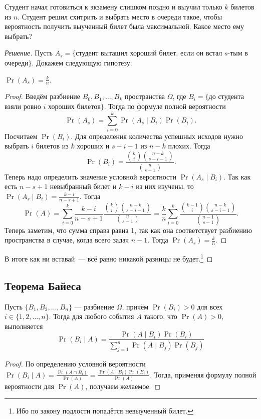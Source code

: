 \begin{problem}
    Студент начал готовиться к экзамену слишком поздно и выучил только \(k\) билетов из \(n\). Студент решил схитрить и выбрать место в очереди такое, чтобы вероятность получить выученный билет была максимальной. Какое место ему выбрать?
\end{problem}
\begin{proof}[Решение]
    Пусть \(A_{s} = \{\)студент вытащил хороший билет, если он встал \(s\)-тым в очереди\(\}\). Докажем следующую гипотезу:
    \begin{hypothesis}
        \(\Pr(A_{s}) = \frac{k}{n}\).
    \end{hypothesis}
    \begin{proof}
        Введём разбиение \(B_{0}, B_{1}, \ldots, B_{k}\) пространства \(\Omega\), где \(B_{i} = \{\)до студента взяли ровно \(i\) хороших билетов\(\}\). Тогда по формуле полной вероятности \[\Pr(A_{s}) = \sum\limits_{i = 0}^{k} \Pr(A_{s} \mid B_{i})\Pr(B_{i}).\]
        Посчитаем \(\Pr(B_{i})\). Для определения количества успешных исходов нужно выбрать \(i\) билетов из \(k\) хороших и \(s - i - 1\) из \(n - k\) плохих. Тогда \[\Pr(B_{i}) = \frac{\binom{k}{i}\binom{n - k}{s - i - 1}}{\binom{n}{s - 1}}.\]
        Теперь надо определить значение условной вероятности \(\Pr(A_{s} \mid B_{i})\). Так как есть \(n - s + 1\) невыбранный билет и \(k - i\) из них изучены, то \(\Pr(A_{s} \mid B_{i}) = \frac{k - i}{n - s + 1}\). Тогда
        \[\Pr(A) = \sum\limits_{i = 0}^{k}\frac{k - i}{n - s + 1}\frac{\binom{k}{i}\binom{n - k}{s - i - 1}}{\binom{n}{s - 1}} = \frac{k}{n}\sum\limits_{i = 0}^{k}\frac{\binom{k - 1}{i}\binom{n - k}{s - i - 1}}{\binom{n - 1}{s - 1}}.\]
        Теперь заметим, что сумма справа равна 1, так как она соответствует разбиению пространства в случае, когда всего задач \(n - 1\). Тогда \(\Pr(A_{s}) = \frac{k}{n}\).
    \end{proof}
    В итоге как ни вставай~--- всё равно никакой разницы не будет.\footnote{Ибо по закону подлости попадётся невыученный билет.}
\end{proof}

\subsection{Теорема Байеса}
\begin{theorem}[Байес]
    Пусть \(\{B_{1}, B_{2}, \ldots, B_{n}\}\) --- разбиение \(\Omega\), причём \(\Pr(B_i) > 0\) для всех \(i \in \{1, 2, \ldots, n\}\). Тогда для любого события \(A\) такого, что \(\Pr(A) > 0\), выполняется
    \[\Pr(B_i \mid A) = \frac{\Pr(A\mid B_i)\Pr(B_i)}{\sum\limits_{j = 1}^{n} \Pr(A\mid B_j)\Pr(B_j)}\]
\end{theorem}
\begin{proof}
    По определению условной вероятности \(\Pr(B_i\mid A) = \frac{\Pr(A\cap B_i)}{\Pr(A)} = \frac{\Pr(A\mid B_i)\Pr(B_i)}{\Pr(A)}\). Тогда, применяя формулу полной вероятности для \(\Pr(A)\), получаем желаемое.
\end{proof}

